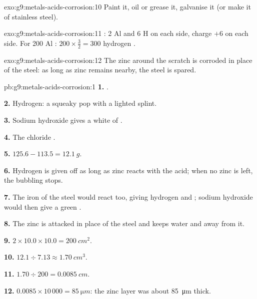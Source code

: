 \begin{solution}{exo:g9:metals-acids-corrosion:10}
Paint it, oil or grease it, galvanise it (or make it of stainless steel).
\end{solution}

\begin{solution}{exo:g9:metals-acids-corrosion:11}
: 2 Al and 6 H on each side,
charge $+6$ on each side. For 200 Al : $200 \times \frac{3}{2} = 300$
hydrogen .
\end{solution}

\begin{solution}{exo:g9:metals-acids-corrosion:12}
The zinc around the scratch is corroded in place of the steel: as long
as zinc remains nearby, the steel is spared.
\end{solution}

\begin{solution}{pb:g9:metals-acids-corrosion:1}
\textbf{1.} .

\textbf{2.} Hydrogen: a squeaky pop with a lighted splint.

\textbf{3.} Sodium hydroxide gives a white  of
.

\textbf{4.} The chloride  .

\textbf{5.} $125.6 - 113.5 = \qty{12.1}{g}$.

\textbf{6.} Hydrogen is given off as long as zinc reacts with the acid;
when no zinc is left, the bubbling stops.

\textbf{7.} The iron of the steel would react too, giving hydrogen and
 ; sodium hydroxide would then give a green .

\textbf{8.} The zinc is attacked in place of the steel and keeps water
and  away from it.

\textbf{9.} $2 \times 10.0 \times 10.0 = \qty{200}{cm^2}$.

\textbf{10.} $12.1 \div 7.13 \approx \qty{1.70}{cm^3}$.

\textbf{11.} $1.70 \div 200 = \qty{0.0085}{cm}$.

\textbf{12.} $0.0085 \times 10\,000 = \qty{85}{\micro m}$: the zinc
layer was about \qty{85}{\micro m} thick.
\end{solution}
